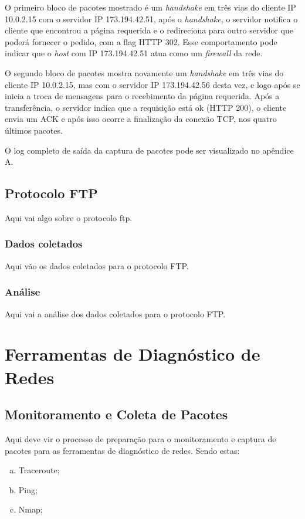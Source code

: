 \documentclass[a4paper]{report} %
\begin{document}
	O primeiro bloco de pacotes mostrado é um \textit{handshake} em três vias do cliente IP 10.0.2.15 com o servidor IP 173.194.42.51, após o \textit{handshake}, o servidor notifica o cliente que encontrou a página requerida e o redireciona para outro servidor que poderá fornecer o pedido, com a flag HTTP 302. Esse comportamento pode indicar que o \textit{host} com IP 173.194.42.51 atua como um \textit{firewall} da rede. 
	
	O segundo bloco de pacotes mostra novamente um \textit{handshake} em três vias do cliente IP 10.0.2.15, mas com o servidor IP 173.194.42.56 desta vez, e logo após se inicia a troca de mensagens para o recebimento da página requerida. Após a transferência, o servidor indica que a requisição está ok (HTTP 200), o cliente envia um ACK e após isso ocorre a finalização da conexão TCP, nos quatro últimos pacotes.

	O log completo de saída da captura de pacotes pode ser visualizado no apêndice A.

\section{Protocolo FTP}
\label{sec_ftp}
Aqui vai algo sobre o protocolo ftp.
\subsection{Dados coletados}
\label{sub_ftp_dados}
Aqui vão os dados coletados para o protocolo FTP.

\subsection{Análise}
\label{sub_ftp_analise}
Aqui vai a análise dos dados coletados para o protocolo FTP.

\chapter{Ferramentas de Diagnóstico de Redes}
\label{chap_segundo}

\section{Monitoramento e Coleta de Pacotes}
\label{sec_segundo_monitoramento}

Aqui deve vir o processo de preparação para o monitoramento e captura de pacotes para as ferramentas de
diagnóstico de redes. Sendo estas:
\begin{enumerate}[a)]
 \item Traceroute;
 \item Ping;
 \item Nmap;
\end{enumerate}
\end{document}

